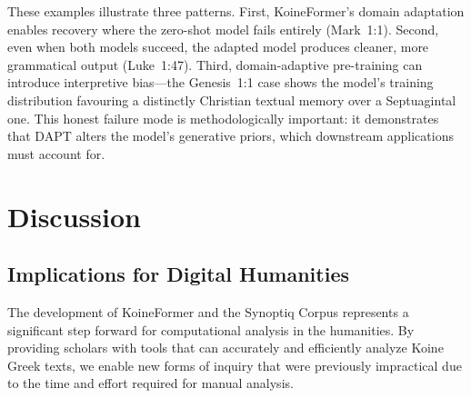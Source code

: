 \documentclass[11pt,letterpaper]{article}
\newcommand{\gk}[1]{{\greekfont\itshape #1}}
\begin{document}
\begin{table}[H]
\caption{\textbf{Qualitative fill-in-the-blank evaluation.}  A comma replaces the target word in the input; each model generates a continuation.  In Mark~1:1, the zero-shot model collapses to a single token (\gk{θεοῦ}), while KoineFormer correctly restores \gk{εὐαγγελίου} (gospel) with a grammatical modifier---a direct demonstration of domain adaptation correcting a baseline failure.  In Luke~1:47, both models recover \gk{σωτῆρί} (savior), but KoineFormer produces a clean clause while the zero-shot model retains input noise.  Genesis~1:1 reveals an interesting interference effect: DAPT reinforcement of the Johannine prologue causes KoineFormer to substitute \gk{ἦν} (was) for \gk{ἐποίησεν} (created)---a theological prior overwriting the Septuagintal reading.  Both models struggle with the list-structured Galatians~5:22 context, a known limitation of span-corruption training.}
\label{tab:qual}
\end{table}

These examples illustrate three patterns.  First, KoineFormer's domain
adaptation enables recovery where the zero-shot model fails entirely
(Mark~1:1).  Second, even when both models succeed, the adapted model
produces cleaner, more grammatical output (Luke~1:47).  Third,
domain-adaptive pre-training can introduce interpretive bias---the
Genesis~1:1 case shows the model's training distribution favouring a
distinctly Christian textual memory over a Septuagintal one.  This
honest failure mode is methodologically important: it demonstrates
that DAPT alters the model's generative priors, which downstream
applications must account for.

\section{Discussion}
\label{sec:discussion}

\subsection{Implications for Digital Humanities}

The development of KoineFormer and the Synoptiq Corpus represents a significant step forward for computational analysis in the humanities. By providing scholars with tools that can accurately and efficiently analyze Koine Greek texts, we enable new forms of inquiry that were previously impractical due to the time and effort required for manual analysis.
\end{document}
